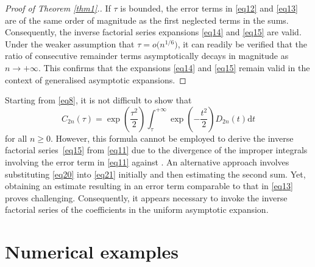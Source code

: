 \documentclass[pdftex]{sigma}
\def\d{\mathrm{d}}
\numberwithin{equation}{section}
\begin{document}
\begin{proof}[Proof of Theorem \ref{thm1}.]
If $\tau$ is bounded, the error terms in \eqref{eq12} and \eqref{eq13} are of the same order of magnitude as the first neglected terms in the sums. Consequently, the inverse factorial series expansions \eqref{eq14} and \eqref{eq15} are valid. Under the weaker assumption that $\tau = o\big(n^{1/6}\big)$, it can readily be verified that the ratio of consecutive remainder terms asymptotically decays in magnitude as $n\to+\infty$. This confirms that the expansions \eqref{eq14} and \eqref{eq15} remain valid in the context of generalised asymptotic expansions.
\end{proof}

\begin{Remark} Starting from \eqref{eq8}, it is not difficult to show that
\begin{equation}\label{eq21}
C_{2n}(\tau ) = \exp\left(\frac{\tau ^2}{2}\right)\int_\tau^{+\infty} \exp \left(-\frac{t^2}{2}\right)D_{2n} (t)\d t
\end{equation}
for all $n\ge 0$. However, this formula cannot be employed to derive the inverse factorial series~\eqref{eq15} from \eqref{eq11} due to the divergence of the improper integrals involving the error term in \eqref{eq11} against . An alternative approach involves substituting \eqref{eq20} into \eqref{eq21} initially and then estimating the second sum. Yet, obtaining an estimate resulting in an error term comparable to that in \eqref{eq13} proves challenging. Consequently, it appears necessary to invoke the inverse factorial series of the coefficients in the uniform asymptotic expansion.
\end{Remark}

\section{Numerical examples}\label{section3}
\end{document}
